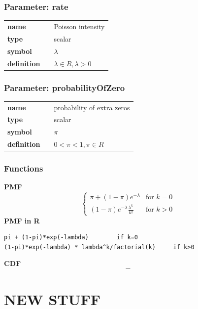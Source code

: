 \subsubsection*{Parameter: rate}

\noindent\begin{tabular}{p{2cm}cl}
\textbf{name} & & Poisson intensity \\
\textbf{type} & & scalar \\
\textbf{symbol} & & $\lambda$  \\
\textbf{definition} & & $\lambda \in R, \lambda > 0$
\end{tabular}
\subsubsection*{Parameter: probabilityOfZero}

\noindent\begin{tabular}{p{2cm}cl}
\textbf{name} & & probability of extra zeros \\
\textbf{type} & & scalar \\
\textbf{symbol} & & $\pi$  \\
\textbf{definition} & & $0<\pi<1, \pi \in  R$
\end{tabular}
\subsubsection*{Functions}

\smallskip \noindent \hspace{.2cm} \textbf{PMF} 
\begin{equation*}\begin{cases}
\pi + (1-\pi) e^{-\lambda}& \text{for } k = 0 \\ 
(1-\pi) e^{-\lambda} \frac{\lambda^k}{k!} & \text{for } k > 0
\end{cases}\end{equation*}
\smallskip \noindent \hspace{.2cm} \textbf{PMF in R}  \\
\begin{verbatim}pi + (1-pi)*exp(-lambda) 		if k=0
(1-pi)*exp(-lambda) * lambda^k/factorial(k)  	if k>0\end{verbatim}
\smallskip \noindent \hspace{.2cm} \textbf{CDF} 
\begin{equation*}-\end{equation*}


\section{NEW STUFF}

